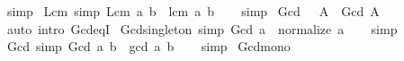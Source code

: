 \begin{isabellebody}
%
\isatagproof
{}\isamarkupfalse%
\ simp%
\endisatagproof
{\isafoldproof}%
%
\isadelimproof
\isanewline
%
\endisadelimproof
\isanewline
{}\isamarkupfalse%
\ Lcm{\isacharunderscore}{\kern0pt}{}\ {\isacharbrackleft}{\kern0pt}simp{\isacharbrackright}{\kern0pt}{\isacharcolon}{\kern0pt}\ {\isachardoublequoteopen}Lcm\ {\isacharbraceleft}{\kern0pt}a{\isacharcomma}{\kern0pt}\ b{\isacharbraceright}{\kern0pt}\ {\isacharequal}{\kern0pt}\ lcm\ a\ b{\isachardoublequoteclose}\isanewline
%
\isadelimproof
\ \ %
\endisadelimproof
%
\isatagproof
{}\isamarkupfalse%
\ simp%
\endisatagproof
{\isafoldproof}%
%
\isadelimproof
\isanewline
%
\endisadelimproof
\isanewline
{}\isamarkupfalse%
\ Gcd{\isacharunderscore}{\kern0pt}{}{\isacharcolon}{\kern0pt}\ {\isachardoublequoteopen}{}\ {\isasymin}\ A\ {\isasymLongrightarrow}\ Gcd\ A\ {\isacharequal}{\kern0pt}\ {}{\isachardoublequoteclose}\isanewline
%
\isadelimproof
\ \ %
\endisadelimproof
%
\isatagproof
{}\isamarkupfalse%
\ {\isacharparenleft}{\kern0pt}auto\ intro{\isacharbang}{\kern0pt}{\isacharcolon}{\kern0pt}\ Gcd{\isacharunderscore}{\kern0pt}eq{\isacharunderscore}{\kern0pt}{}{\isacharunderscore}{\kern0pt}I{\isacharparenright}{\kern0pt}%
\endisatagproof
{\isafoldproof}%
%
\isadelimproof
\isanewline
%
\endisadelimproof
\isanewline
{}\isamarkupfalse%
\ Gcd{\isacharunderscore}{\kern0pt}singleton\ {\isacharbrackleft}{\kern0pt}simp{\isacharbrackright}{\kern0pt}{\isacharcolon}{\kern0pt}\ {\isachardoublequoteopen}Gcd\ {\isacharbraceleft}{\kern0pt}a{\isacharbraceright}{\kern0pt}\ {\isacharequal}{\kern0pt}\ normalize\ a{\isachardoublequoteclose}\isanewline
%
\isadelimproof
\ \ %
\endisadelimproof
%
\isatagproof
{}\isamarkupfalse%
\ simp%
\endisatagproof
{\isafoldproof}%
%
\isadelimproof
\isanewline
%
\endisadelimproof
\isanewline
{}\isamarkupfalse%
\ Gcd{\isacharunderscore}{\kern0pt}{}\ {\isacharbrackleft}{\kern0pt}simp{\isacharbrackright}{\kern0pt}{\isacharcolon}{\kern0pt}\ {\isachardoublequoteopen}Gcd\ {\isacharbraceleft}{\kern0pt}a{\isacharcomma}{\kern0pt}\ b{\isacharbraceright}{\kern0pt}\ {\isacharequal}{\kern0pt}\ gcd\ a\ b{\isachardoublequoteclose}\isanewline
%
\isadelimproof
\ \ %
\endisadelimproof
%
\isatagproof
{}\isamarkupfalse%
\ simp%
\endisatagproof
{\isafoldproof}%
%
\isadelimproof
\isanewline
%
\endisadelimproof
\isanewline
{}\isamarkupfalse%
\ Gcd{\isacharunderscore}{\kern0pt}mono{\isacharcolon}{\kern0pt}\isanewline

\end{isabellebody}
